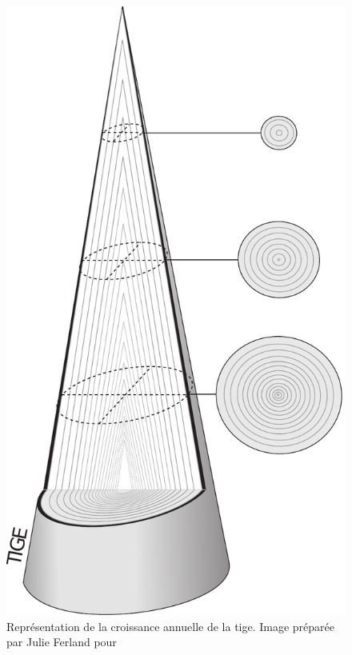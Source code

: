\begin{figure}[ht]
\centering
\includegraphics[scale=0.5]{img/ch2_croissance_cernes}
\caption{Représentation de la croissance annuelle de la tige. Image préparée par Julie Ferland pour \cite{achim2010dendroecologie}}
\label{croissance}
\end{figure}

